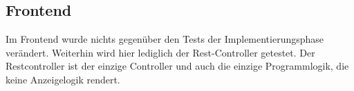 \subsection{Frontend}
Im Frontend wurde nichts gegenüber den Tests der Implementierungsphase verändert.
Weiterhin wird hier lediglich der Rest-Controller getestet.
Der Restcontroller ist der einzige Controller und auch die einzige Programmlogik, die keine Anzeigelogik rendert.